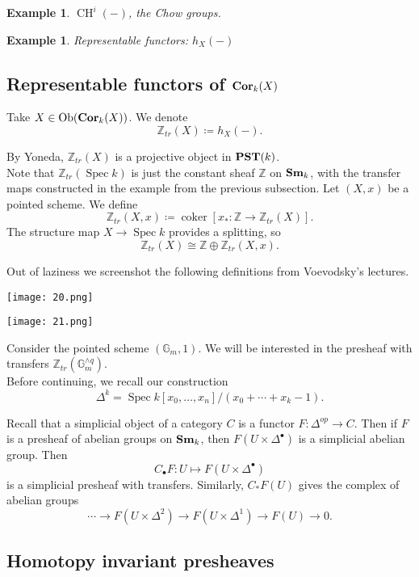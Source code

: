 \documentclass[a4paper, 11pt]{article} %
\newtheorem{example}[theorem]{Example}
\theoremstyle{remark}
\newcommand{\?}{{\color{red} ???}}
\newcommand{\mb}{\mathbb}
\newcommand{\Z}{\mb{Z}}
\newcommand{\G}{\mb{G}}
\newcommand{\catname}[1]{{\normalfont\textbf{#1}}}
\newcommand{\Sm}{\catname{Sm}}
\newcommand{\Cor}{\catname{Cor}}
\newcommand{\PST}{\catname{PST}}
\DeclareMathOperator{\Spec}{Spec}
\DeclareMathOperator{\coker}{coker}
\DeclareMathOperator{\CH}{CH}
\DeclareMathOperator{\Ob}{Ob}
\begin{document}
\begin{example}
$\CH^i(-)$, the Chow groups.
\end{example}

\begin{example}
Representable functors: $h_X(-)$
\end{example} 

\subsection{Representable functors of $\Cor_k(X)$} 
Take $X\in \Ob(\Cor_k(X))$.  We denote
\[
\Z_{tr}(X)\coloneqq h_X(-).
\]

By Yoneda, $\Z_{tr}(X)$ is a projective object in $\PST(k)$. \\ 

Note that $\Z_{tr}(\Spec k)$ is just the constant sheaf $\Z$ on $\Sm_k$, with the transfer maps constructed in the example from the previous subsection.  Let $(X, x)$ be a pointed scheme.  We define 
\[
\Z_{tr}(X, x)\coloneqq \coker [x_*:\Z\rightarrow \Z_{tr}(X)].
\]
The structure map $X\rightarrow\Spec k$ provides a splitting, so 
\[
\Z_{tr}(X)\cong \Z\oplus \Z_{tr}(X, x).
\]

Out of laziness we screenshot the following definitions from Voevodsky's lectures.

\texttt{[image: 20.png]}

\texttt{[image: 21.png]} 

Consider the pointed scheme $(\G_m, 1)$.  We will be interested in the presheaf with transfers $\Z_{tr}(\G_m^{\wedge q})$. \\ 

Before continuing, we recall our construction \[
\Delta^k = \Spec k[x_0, \ldots, x_n]/(x_0+\cdots +x_k-1).
\] 

Recall that a simplicial object of a category $C$ is a functor $F:\Delta^{op}\rightarrow C$.
Then if $F$ is a presheaf of abelian groups on $\Sm_k$, then $F(U\times\Delta^\bullet)$ is a simplicial abelian group.  Then 
\[
C_\bullet F: U\mapsto F(U\times \Delta^\bullet)
\]
is a simplicial presheaf with transfers.  Similarly, $C_*F(U)$ gives the complex of abelian groups 
\[
\cdots\rightarrow F(U\times \Delta^2)\rightarrow F(U\times \Delta^1)\rightarrow F(U)\rightarrow 0.
\]

\subsection{Homotopy invariant presheaves}
\end{document}
